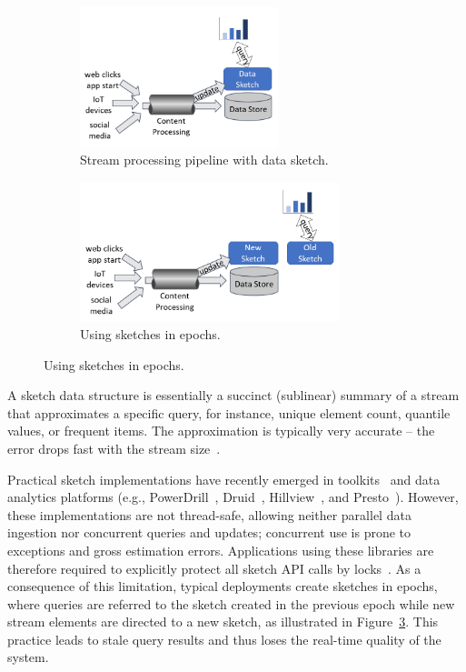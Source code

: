 \begin{figure}[htb]
  \begin{subfigure}[b]{.45\linewidth}
      \includegraphics[height=1.6in]{graphics/fast-concurrent/pipeline-crop.png}
  \caption{Stream processing pipeline with data sketch.}
  \label{fc-fig:pipeline}
  \end{subfigure}
  \begin{subfigure}[b]{.55\linewidth}
    \includegraphics[height=1.6in]{graphics/fast-concurrent/epochs-crop.png}
  \caption{Using sketches in epochs.}
  \label{fc-fig:epochs}
  \end{subfigure}
\end{figure}

A sketch data structure is essentially a succinct (sublinear) summary of a stream that approximates a specific query, for instance, unique element count, quantile values, or frequent items. 
The approximation is typically very accurate -- the error drops fast with the stream size~\cite{Cormode:2017}. 

Practical sketch implementations have recently emerged in toolkits~\cite{DataSketches}
and data analytics platforms (e.g., PowerDrill~\cite{heule2013hyperloglog}, Druid~\cite{druid}, 
Hillview~\cite{hillview}, and Presto~\cite{PrestoHLL}). 
However, these implementations are not thread-safe, allowing neither
parallel data ingestion nor concurrent queries and updates; concurrent use is prone to exceptions and 
gross estimation errors. Applications using these libraries are therefore required to explicitly protect all sketch API calls by locks~\cite{lee-groups-post, lee-issue}.
As a consequence of this limitation, typical deployments create sketches in epochs, where queries are referred to the sketch created in the previous epoch while new stream elements are directed to a new sketch, as illustrated in Figure~\ref{fc-fig:epochs}. This practice leads to stale query results and thus
loses the real-time quality of the system.  

